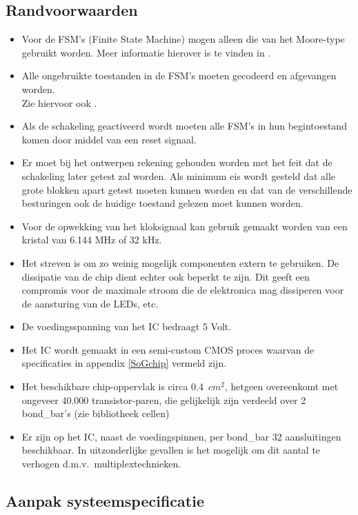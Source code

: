 \subsection{Randvoorwaarden}

\begin{itemize}
\item
Voor de FSM's (Finite State Machine) mogen alleen die van het
Moore-type gebruikt worden. Meer informatie hierover is te vinden in
\cite{DT2}.

\item
Alle ongebruikte toestanden in de FSM's moeten gecodeerd en afgevangen
worden.\\
Zie hiervoor ook \cite{DT2}.
\item
Als de schakeling geactiveerd wordt moeten alle FSM's in hun
begintoestand komen door middel van een reset signaal.
\item
Er moet bij het ontwerpen rekening gehouden worden met het feit dat de
schakeling later getest zal worden. Als minimum eis wordt gesteld dat
alle grote blokken apart getest moeten kunnen worden en dat van de
verschillende besturingen ook de huidige toestand gelezen moet kunnen
worden.
\item
Voor de opwekking van het kloksignaal kan gebruik gemaakt worden van
een kristal van 6.144 MHz of 32 kHz.
\item
Het streven is om zo weinig mogelijk componenten extern
te gebruiken. De dissipatie van de chip dient echter ook beperkt
te zijn. Dit geeft een compromis voor de maximale stroom die de elektronica
mag dissiperen voor de aansturing van de LEDs, etc.
\item
De voedingsspanning van het IC bedraagt 5 Volt.
\item
Het IC wordt gemaakt in een semi-custom CMOS proces waarvan de
specificaties in appendix \ref{SoGchip} vermeld zijn.
\item
Het beschikbare chip-oppervlak is circa 0.4 $\,cm^2$,
hetgeen overeenkomt met ongeveer 40.000 transistor-paren,
die gelijkelijk zijn verdeeld over 2 bond\_bar's (zie bibliotheek cellen)
\item
Er zijn op het IC, naast de voedingspinnen, per bond\_bar 32 aansluitingen
beschikbaar.
In uitzonderlijke gevallen is het mogelijk om dit aantal te verhogen 
d.m.v.\ multiplextechnieken.
\end{itemize}

\subsection{Aanpak systeemspecificatie}

